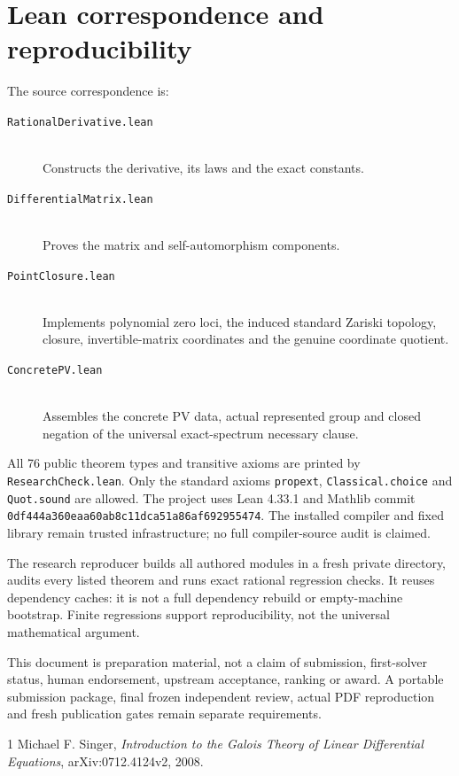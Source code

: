 \documentclass[10pt,a4paper]{article}
\begin{document}
\section{Lean correspondence and reproducibility}
The source correspondence is:
\begin{description}
\item[\texttt{RationalDerivative.lean}] \hfill\\
Constructs the derivative, its laws and the exact constants.
\item[\texttt{DifferentialMatrix.lean}] \hfill\\
Proves the matrix and self-automorphism components.
\item[\texttt{PointClosure.lean}] \hfill\\
Implements polynomial zero loci, the induced standard Zariski topology,
closure, invertible-matrix coordinates and the genuine coordinate quotient.
\item[\texttt{ConcretePV.lean}] \hfill\\
Assembles the concrete PV data, actual represented group and closed negation
of the universal exact-spectrum necessary clause.
\end{description}

All 76 public theorem types and transitive axioms are printed by
\texttt{ResearchCheck.lean}. Only the standard axioms \texttt{propext},
\texttt{Classical.choice} and \texttt{Quot.sound} are allowed. The project uses
Lean 4.33.1 and Mathlib commit
\texttt{0df444a360eaa60ab8c11dca51a86af692955474}. The installed compiler and
fixed library remain trusted infrastructure; no full compiler-source audit is claimed.

The research reproducer builds all authored modules in a fresh private directory,
audits every listed theorem and runs exact rational regression checks. It reuses
dependency caches: it is not a full dependency rebuild or empty-machine bootstrap.
Finite regressions support reproducibility, not the universal mathematical argument.

This document is preparation material, not a claim of submission, first-solver
status, human endorsement, upstream acceptance, ranking or award. A portable
submission package, final frozen independent review, actual PDF reproduction and
fresh publication gates remain separate requirements.

\begin{thebibliography}{1}
Michael F. Singer, \emph{Introduction to the Galois Theory of Linear
Differential Equations}, arXiv:0712.4124v2, 2008.
\end{thebibliography}
\end{document}
